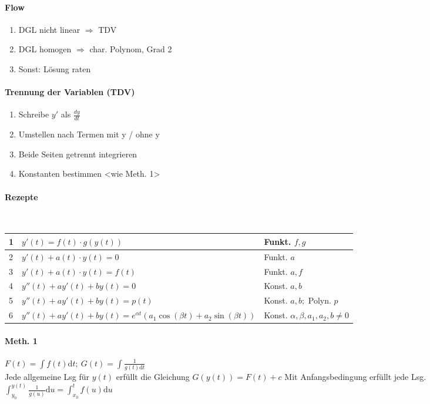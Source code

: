 \documentclass[paper=a3,paper=landscape, fontsize=9pt, DIV=30]{scrartcl}
\begin{document}
\begin{multicols*}{4}
  \paragraph{Flow}
  \begin{enumerate}
  	\item DGL nicht linear $\Rightarrow$ TDV
  	\item DGL homogen $\Rightarrow$ char. Polynom, Grad 2
  	\item Sonst: Lösung raten
  \end{enumerate}

\paragraph{Trennung der Variablen (TDV)}
  \begin{enumerate}
  	\item Schreibe $y'$ als $\frac{dy}{dt}$
  	\item Umstellen nach Termen mit y / ohne y
  	\item Beide Seiten getrennt integrieren
  	\item Konstanten bestimmen <wie Meth. 1>
  \end{enumerate}
  
  \paragraph{Rezepte}\hspace{0pt}\\
  
  \begin{tabular}{|l| p{5cm}|l|}
    \hline
    1   & $y'(t)=f(t) \cdot g(y(t))$      & Funkt. $f,g$              \\ \hline
    2   & $y'(t)+a(t) \cdot y(t) = 0$     & Funkt. $a$                \\ \hline
    3   & $y'(t)+a(t) \cdot y(t) = f(t)$  & Funkt. $a,f$              \\ \hline
    4   & $y''(t)+ay'(t)+by(t) = 0$       & Konst. $a,b$              \\ \hline
    5   & $y''(t)+ay'(t)+by(t) = p(t)$    & Konst. $a,b;$ Polyn. $p$  \\ \hline
    6   & $y''(t)+ay'(t)+by(t) = e^{\alpha t} (a_1 \cos(\beta t)+ a_2 \sin(\beta t))$  & Konst. $\alpha,\beta,a_1, a_2,  b \neq 0$            \\ \hline
  \end{tabular}

  \paragraph{Meth. 1}
  $F(t)=\int f(t) \mathrm{d}t;\ G(t)=\int \frac{1}{g(t)\mathrm{d}t}$\\
  Jede allgemeine Lsg für $y(t)$ erfüllt die Gleichung $G(y(t))=F(t)+c$
  Mit Anfangsbedingung erfüllt jede Lsg. $\int_{y_0}^{y(t)}\frac{1}{g(u)}\mathrm{d}u=\int_{x_0}^{t}f(u)\mathrm{d}u$


\end{multicols*}
\end{document}
